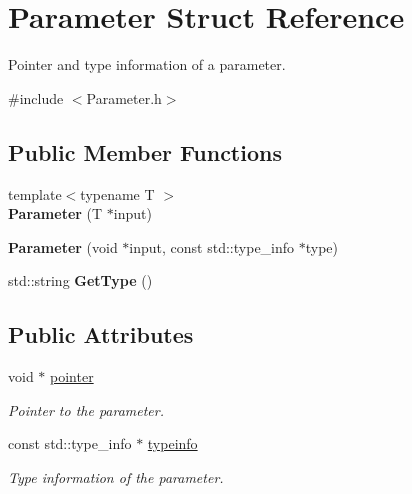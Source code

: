 \hypertarget{structParameter}{\section{Parameter Struct Reference}
\label{structParameter}
}


Pointer and type information of a parameter.  




{\ttfamily \#include $<$Parameter.\-h$>$}

\subsection*{Public Member Functions}
\begin{DoxyCompactItemize}
\item 
\hypertarget{structParameter_a03adc91dc695b308db4e466c3c522afc}{{\footnotesize template$<$typename T $>$ }\\{\bfseries Parameter} (T $\ast$input)}\label{structParameter_a03adc91dc695b308db4e466c3c522afc}

\item 
\hypertarget{structParameter_a47ca57d7377d16a561aa61eeb660fd40}{{\bfseries Parameter} (void $\ast$input, const std\-::type\-\_\-info $\ast$type)}\label{structParameter_a47ca57d7377d16a561aa61eeb660fd40}

\item 
\hypertarget{structParameter_acbaa165bda6b087c2e99fdb8925a7d89}{std\-::string {\bfseries Get\-Type} ()}\label{structParameter_acbaa165bda6b087c2e99fdb8925a7d89}

\end{DoxyCompactItemize}
\subsection*{Public Attributes}
\begin{DoxyCompactItemize}
\item 
\hypertarget{structParameter_ab93b3e7a68feb86fe5a1d1734d125e7e}{void $\ast$ \hyperlink{structParameter_ab93b3e7a68feb86fe5a1d1734d125e7e}{pointer}}\label{structParameter_ab93b3e7a68feb86fe5a1d1734d125e7e}

\begin{DoxyCompactList}\small\item\em Pointer to the parameter. \end{DoxyCompactList}\item 
\hypertarget{structParameter_a9f8602d10b3c497bde219c4e6a8b1b60}{const std\-::type\-\_\-info $\ast$ \hyperlink{structParameter_a9f8602d10b3c497bde219c4e6a8b1b60}{typeinfo}}\label{structParameter_a9f8602d10b3c497bde219c4e6a8b1b60}

\begin{DoxyCompactList}\small\item\em Type information of the parameter. \end{DoxyCompactList}\end{DoxyCompactItemize}


